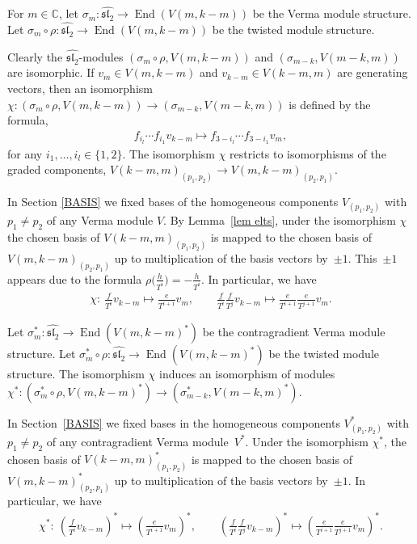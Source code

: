 \documentclass[11pt]{article}
\numberwithin{equation}{section}
\begin{document}
For $m\in{\mathbb C}$, let $\sigma_m \colon \widehat{{\mathfrak{sl}_2}} \to \operatorname{End}( V(m,k-m))$ be the Verma module structure. Let $\sigma_m\circ \rho \colon \widehat{{\mathfrak{sl}_2}} \to \operatorname{End}( V(m,k-m))$ be the twisted module structure.

Clearly the $\widehat{{\mathfrak{sl}_2}}$-modules $(\sigma_m\circ \rho, V(m,k-m))$ and $(\sigma_{m-k}, V(m-k,m))$ are isomorphic. If $v_m\in V(m,k-m)$ and $v_{k-m}\in V(k-m,m)$ are generating vectors, then an isomorphism $\chi\colon (\sigma_m\circ \rho, V(m,k-m)) \to (\sigma_{m-k}, V(m-k,m))$ is defined by the formula,
\begin{gather*}
f_{i_l}\cdots f_{i_1}v_{k-m} \mapsto f_{3-i_l}\cdots f_{3-i_1}v_{m},
\end{gather*}
for any $i_1,\dots,i_l\in\{1,2\}$. The isomorphism $\chi$ restricts to isomorphisms of the graded components, $V(k-m,m)_{(p_1,p_2)} \to V(m,k-m)_{(p_2,p_1)}$.

In Section \ref{BASIS} we fixed bases of the homogeneous components $V_{(p_1,p_2)}$ with $p_1\ne p_2$ of any Verma module $V$. By Lemma~\ref{lem elts}, under the isomorphism $\chi$ the chosen basis of $V(k-m, m)_{(p_1,p_2)}$ is mapped to the chosen basis of $V(m,k-m)_{(p_2,p_1)}$ up to multiplication of the basis vectors by~$\pm 1$. This~$\pm 1$ appears due to the formula $\rho\big(\frac h{T^i}\big) = - \frac h{T^i}$. In particular, we have
\begin{gather*}
\chi \colon \ \frac f{T^i}v_{k-m} \mapsto \frac e{T^{i+1}}v_{m}, \qquad
\frac f{T^i} \frac f{T^j} v_{k-m} \mapsto \frac e{T^{i+1}}\frac e{T^{j+1}}v_{m}.
\end{gather*}

Let $ \sigma^*_m \colon \widehat{{\mathfrak{sl}_2}} \to \operatorname{End}( V(m,k-m)^*)$ be the contragradient Verma module structure. Let $ \sigma^*_m\circ \rho \colon \widehat{{\mathfrak{sl}_2}} \to \operatorname{End}( V(m,k-m)^*)$ be the twisted module structure. The isomorphism $\chi$ induces an isomorphism of modules $\chi^* \colon (\sigma^*_m\circ \rho, V(m,k-m)^*) \to (\sigma^*_{m-k}, V(m-k,m)^*)$.

In Section~\ref{BASIS} we fixed bases in the homogeneous components $V^*_{(p_1,p_2)}$ with $p_1\ne p_2$ of any contragradient Verma module~$V^*$. Under the isomorphism $\chi^*$, the chosen basis of $V(k-m, m)^*_{(p_1,p_2)}$ is mapped to the chosen basis of $V(m,k-m)^*_{(p_2,p_1)}$ up to multiplication of the basis vectors by~$\pm 1$. In particular, we have
\begin{gather*}
 \chi^* \colon \ \left(\frac f{T^i}v_{k-m}\right)^* \mapsto \left(\frac e{T^{i+1}}v_{m}\right)^*, \qquad
\left(\frac f{T^i} \frac f{T^j} v_{k-m}\right)^* \mapsto \left(\frac e{T^{i+1}}\frac e{T^{j+1}}v_{m}\right)^*.
\end{gather*}
\end{document}
